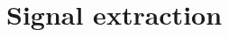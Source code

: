 \documentclass[a4paper, 10pt, openright]{report}
\begin{document}
%


























\chapter{Signal extraction} \label{section:Discrimination}
\end{document}
